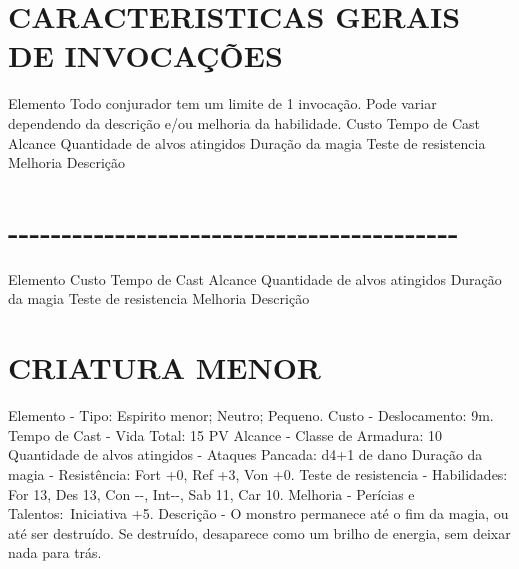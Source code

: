 \documentclass{article}%
\begin{document}
%
\section{CARACTERISTICAS GERAIS DE INVOCAÇÕES}%
\label{sec:CARACTERISTICASGERAISDEINVOCAES}%
Elemento Todo conjurador tem um limite de 1 invocação. Pode variar dependendo da descrição e/ou melhoria da habilidade.\newline%
Custo \newline%
Tempo de Cast \newline%
Alcance \newline%
Quantidade de alvos atingidos \newline%
Duração da magia \newline%
Teste de resistencia \newline%
Melhoria \newline%
Descrição \newline%

%
\section{{-}{-}{-}{-}{-}{-}{-}{-}{-}{-}{-}{-}{-}{-}{-}{-}{-}{-}{-}{-}{-}{-}{-}{-}{-}{-}{-}{-}{-}{-}{-}{-}{-}{-}{-}{-}{-}{-}{-}{-}{-}{-}}%
\label{sec:{-}{-}{-}{-}{-}{-}{-}{-}{-}{-}{-}{-}{-}{-}{-}{-}{-}{-}{-}{-}{-}{-}{-}{-}{-}{-}{-}{-}{-}{-}{-}{-}{-}{-}{-}{-}{-}{-}{-}{-}{-}{-}}%
Elemento \newline%
Custo \newline%
Tempo de Cast \newline%
Alcance \newline%
Quantidade de alvos atingidos \newline%
Duração da magia \newline%
Teste de resistencia \newline%
Melhoria \newline%
Descrição \newline%

%
\section{CRIATURA MENOR}%
\label{sec:CRIATURAMENOR}%
Elemento {-} Tipo: Espirito menor; Neutro; Pequeno.\newline%
Custo {-} Deslocamento: 9m.\newline%
Tempo de Cast {-} Vida Total: 15 PV\newline%
Alcance {-} Classe de Armadura: 10\newline%
Quantidade de alvos atingidos {-} Ataques Pancada: d4+1 de dano\newline%
Duração da magia {-} Resistência: Fort +0, Ref +3, Von +0.\newline%
Teste de resistencia {-} Habilidades: For 13, Des 13, Con {-}{-}, Int{-}{-}, Sab 11, Car 10.\newline%
Melhoria {-} Perícias e Talentos:~Iniciativa +5.\newline%
Descrição {-} O monstro permanece até o fim da magia, ou até ser destruído. Se destruído, desaparece como um brilho de energia, sem deixar nada para trás.\newline%
\end{document}
